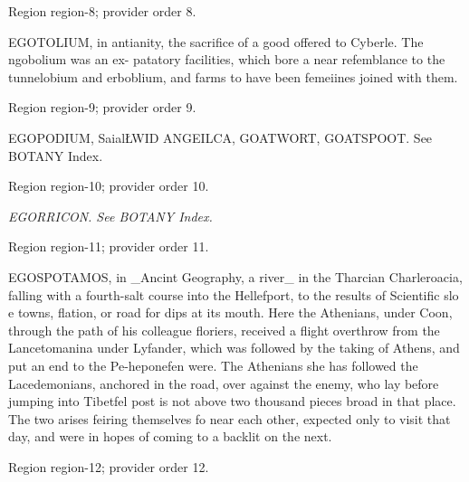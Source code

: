 \documentclass[11pt]{article}
\begin{document}
{\scriptsize\color{gray} Region region-8; provider order 8.\par}
\medskip

EGOTOLIUM, in antianity, the sacrifice of a good offered to Cyberle. The ngobolium was an ex- patatory facilities, which bore a near refemblance to the tunnelobium and erboblium, and farms to have been femeiines joined with them.
\par

{\scriptsize\color{gray} Region region-9; provider order 9.\par}
\medskip

EGOPODIUM, SaialŁWID ANGEILCA, GOATWORT, GOATSPOOT. See BOTANY Index.
\par

{\scriptsize\color{gray} Region region-10; provider order 10.\par}
\medskip

{\small\itshape EGORRICON. See BOTANY Index.\par}

{\scriptsize\color{gray} Region region-11; provider order 11.\par}
\medskip

EGOSPOTAMOS, in \_Ancint Geography, a river\_ in the Tharcian Charleroacia, falling with a fourth-salt course into the Hellefport, to the results of Scientific slo e towns, flation, or road for dips at its mouth. Here the Athenians, under Coon, through the path of his colleague floriers, received a flight overthrow from the Lancetomanina under Lyfander, which was followed by the taking of Athens, and put an end to the Pe-heponefen were. The Athenians she has followed the Lacedemonians, anchored in the road, over against the enemy, who lay before jumping into Tibetfel post is not above two thousand pieces broad in that place. The two arises feiring themselves fo near each other, expected only to visit that day, and were in hopes of coming to a backlit on the next.
\par

{\scriptsize\color{gray} Region region-12; provider order 12.\par}
\medskip
\end{document}
